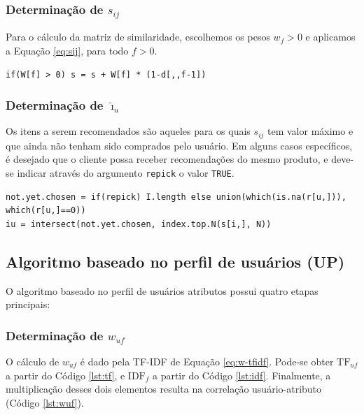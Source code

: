 \subsubsection{Determinação de  $s_{ij}$} %
\label{ssub:determina_o_de_s__ij_}

Para o cálculo da matriz de similaridade, escolhemos os pesos $w_f>0$ e aplicamos a Equação \ref{eq:sij}, para todo $f>0$.

\begin{lstlisting}[caption=Determinação de $s_{ij}$]
if(W[f] > 0) s = s + W[f] * (1-d[,,f-1])
\end{lstlisting}

\subsubsection{Determinação de $\hat{\imath}_u$} %
\label{ssub:determina_o_de_i_u_}

Os itens a serem recomendados são aqueles para os quais $s_{ij}$ tem valor máximo e que ainda não tenham sido comprados pelo usuário. Em alguns casos específicos, é desejado que o cliente possa receber recomendações do mesmo produto, e deve-se indicar através do argumento \texttt{repick} o valor \texttt{TRUE}.

\begin{lstlisting}[caption=Determinação de $\hat{\imath}_{u}$]
not.yet.chosen = if(repick) I.length else union(which(is.na(r[u,])), which(r[u,]==0))
iu = intersect(not.yet.chosen, index.top.N(s[i,], N))
\end{lstlisting}

\subsection{Algoritmo baseado no perfil de usuários (UP)} %
\label{sub:algoritmo_baseado_no_perfil_de_usu_rios_up_}

O algoritmo baseado no perfil de usuários atributos possui quatro etapas principais: 


\subsubsection{Determinação de $w_{uf}$} %
\label{ssub:determina_o_de_}

O cálculo de $w_{uf}$ é dado pela TF-IDF de Equação \ref{eq:w-tfidf}. Pode-se obter $\mathrm{TF}_{uf}$ a partir do Código \ref{lst:tf}, e $\mathrm{IDF}_{f}$ a partir do Código \ref{lst:idf}. Finalmente, a multiplicação desses dois elementos resulta na correlação usuário-atributo (Código \ref{lst:wuf}).


